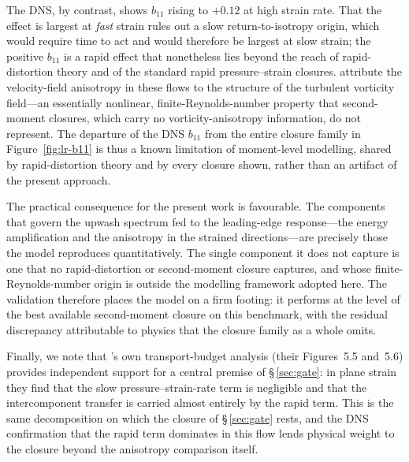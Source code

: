 \documentclass[lineno]{JFM-FLM_Au}
\begin{document}
The DNS, by contrast, shows $b_{11}$ rising to $+0.12$ at high strain rate. That
the effect is largest at \emph{fast} strain rules out a slow return-to-isotropy
origin, which would require time to act and would therefore be largest at slow
strain; the positive $b_{11}$ is a rapid effect that nonetheless lies beyond the
reach of rapid-distortion theory and of the standard rapid pressure--strain
closures. \citet{LeeReynolds1985} attribute the velocity-field anisotropy in
these flows to the structure of the turbulent vorticity field---an essentially
nonlinear, finite-Reynolds-number property that second-moment closures, which
carry no vorticity-anisotropy information, do not represent. The departure of the
DNS $b_{11}$ from the entire closure family in Figure~\ref{fig:lr-b11} is thus a
known limitation of moment-level modelling, shared by rapid-distortion theory and
by every closure shown, rather than an artifact of the present approach.

The practical consequence for the present work is favourable. The components that
govern the upwash spectrum fed to the leading-edge response---the energy
amplification and the anisotropy in the strained directions---are precisely those
the model reproduces quantitatively. The single component it does not capture is
one that no rapid-distortion or second-moment closure captures, and whose
finite-Reynolds-number origin is outside the modelling framework adopted here. The
validation therefore places the model on a firm footing: it performs at the level
of the best available second-moment closure on this benchmark, with the residual
discrepancy attributable to physics that the closure family as a whole omits.

Finally, we note that \citeauthor{LeeReynolds1985}'s own transport-budget analysis
(their Figures~5.5 and~5.6) provides independent support for a central premise of
\S\,\ref{sec:gate}: in plane strain they find that the slow pressure--strain-rate
term is negligible and that the intercomponent transfer is carried almost entirely
by the rapid term. This is the same decomposition on which the closure of
\S\,\ref{sec:gate} rests, and the DNS confirmation that the rapid term dominates in
this flow lends physical weight to the closure beyond the anisotropy comparison
itself.










\end{document}
